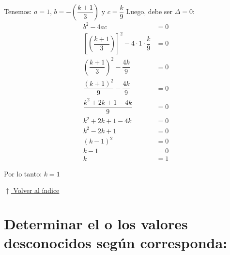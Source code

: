 \documentclass[12pt]{article}
\newcommand{\volverindice}{%
    \vspace{1em}%
    \begin{flushright}%
        \hyperlink{indice}{\small $\uparrow$ Volver al índice}%
    \end{flushright}%
}
\begin{document}
\begin{enumerate}[label=\alph*.-]
Tenemos: $a = 1$, $b = -\left(\dfrac{k+1}{3}\right)$ y $c = \dfrac{k}{9}$
Luego, debe ser $\Delta = 0$:
\begin{align*}
b^2 - 4ac &= 0 \\[0.3em]
\left[\left(\dfrac{k+1}{3}\right)\right]^2 - 4 \cdot 1 \cdot \dfrac{k}{9} &= 0 \\[0.3em]
\left(\dfrac{k+1}{3}\right)^2 - \dfrac{4k}{9} &= 0 \\[0.3em]
\dfrac{(k+1)^2}{9} - \dfrac{4k}{9} &= 0 \\[0.3em]
\dfrac{k^2 + 2k + 1 - 4k}{9} &= 0 \\[0.3em]
k^2 + 2k + 1 - 4k &= 0 \\[0.3em]
k^2 - 2k + 1 &= 0 \\[0.3em]
(k - 1)^2 &= 0 \\[0.3em]
k - 1 &= 0 \\[0.3em]
k &= 1
\end{align*}

Por lo tanto: $\boxed{k = 1}$

\end{enumerate}
\volverindice

\newpage
\section[Valores desconocidos en ecuaciones cuadráticas]{Determinar el o los valores desconocidos según corresponda:}
\end{document}

